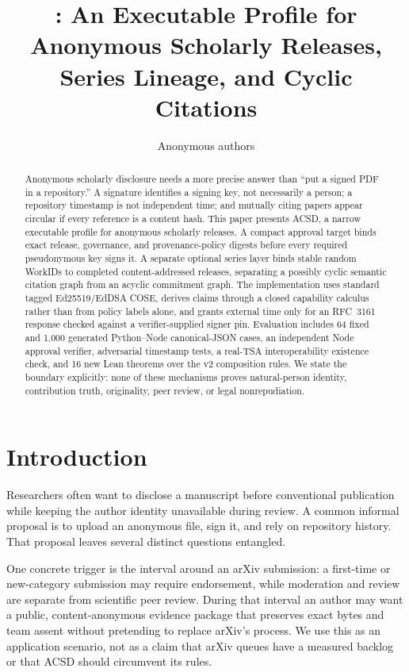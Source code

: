 \documentclass[11pt]{article}
\title{\acsd: An Executable Profile for Anonymous Scholarly Releases,\\ Series Lineage, and Cyclic Citations}
\author{Anonymous authors}
\date{}
\newcommand{\workid}{\textsf{WorkID}}
\newcommand{\acsd}{\textsc{ACSD}}
\begin{document}
\maketitle

\begin{abstract}
Anonymous scholarly disclosure needs a more precise answer than ``put a signed PDF in a repository.'' A signature identifies a signing key, not necessarily a person; a repository timestamp is not independent time; and mutually citing papers appear circular if every reference is a content hash. This paper presents \acsd, a narrow executable profile for anonymous scholarly releases. A compact approval target binds exact release, governance, and provenance-policy digests before every required pseudonymous key signs it. A separate optional series layer binds stable random \workid s to completed content-addressed releases, separating a possibly cyclic semantic citation graph from an acyclic commitment graph. The implementation uses standard tagged Ed25519/EdDSA COSE, derives claims through a closed capability calculus rather than from policy labels alone, and grants external time only for an RFC~3161 response checked against a verifier-supplied signer pin. Evaluation includes 64 fixed and 1,000 generated Python--Node canonical-JSON cases, an independent Node approval verifier, adversarial timestamp tests, a real-TSA interoperability existence check, and 16 new Lean theorems over the v2 composition rules. We state the boundary explicitly: none of these mechanisms proves natural-person identity, contribution truth, originality, peer review, or legal nonrepudiation.
\end{abstract}

\section{Introduction}

Researchers often want to disclose a manuscript before conventional publication while keeping the author identity unavailable during review. A common informal proposal is to upload an anonymous file, sign it, and rely on repository history. That proposal leaves several distinct questions entangled.

One concrete trigger is the interval around an arXiv submission: a first-time or
new-category submission may require endorsement, while moderation and review
are separate from scientific peer review. During that interval an author may
want a public, content-anonymous evidence package that preserves exact bytes
and team assent without pretending to replace arXiv's process. We use this as
an application scenario, not as a claim that arXiv queues have a measured
backlog or that ACSD should circumvent its rules.
\end{document}
